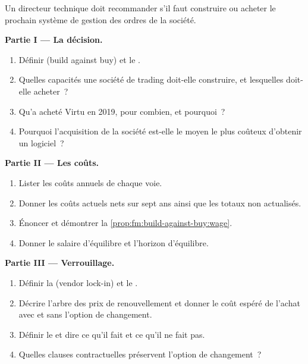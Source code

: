 \begin{problem}\label{pb:fm:build-against-buy:1}
Un directeur technique doit recommander s'il faut construire ou acheter le prochain système de gestion des ordres de la société.

\medskip\noindent\textbf{Partie I --- La décision.}
\begin{enumerate}
\item Définir  (build against buy) et le .
\item Quelles capacités une société de trading doit-elle construire, et lesquelles doit-elle acheter~?
\item Qu'a acheté Virtu en 2019, pour combien, et pourquoi~?
\item Pourquoi l'acquisition de la société est-elle le moyen le plus coûteux d'obtenir un logiciel~?
\end{enumerate}

\medskip\noindent\textbf{Partie II --- Les coûts.}
\begin{enumerate}[resume]
\item Lister les coûts annuels de chaque voie.
\item Donner les coûts actuels nets sur sept ans ainsi que les totaux non actualisés.
\item Énoncer et démontrer la \cref{prop:fm:build-against-buy:wage}.
\item Donner le salaire d'équilibre et l'horizon d'équilibre.
\end{enumerate}

\medskip\noindent\textbf{Partie III --- Verrouillage.}
\begin{enumerate}[resume]
\item Définir la  (vendor lock-in) et le .
\item Décrire l'arbre des prix de renouvellement et donner le coût espéré de l'achat avec et sans l'option de changement.
\item Définir le  et dire ce qu'il fait et ce qu'il ne fait pas.
\item Quelles clauses contractuelles préservent l'option de changement~?
\end{enumerate}


\end{problem}
